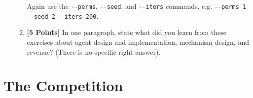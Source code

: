 \documentclass[11pt]{article}
\newcommand{\points}[1]{\textbf{[#1 Points]}}
\begin{document}
\begin{enumerate}
\begin{enumerate}
				Again use the \verb+--perms+, \verb+--seed+, and \verb+--iters+ commands, e.g. \verb+--perms 1 --seed 2+ \verb+--iters 200+.

                              \item \points{5} In one paragraph,
state what
                                did you learn from these exercises
                                about agent design and implementation,
                                mechanism design, and revenue? (There
                                is no specific right answer).
			\end{enumerate}

\end{enumerate}

\section{The Competition}
	
\end{document}
